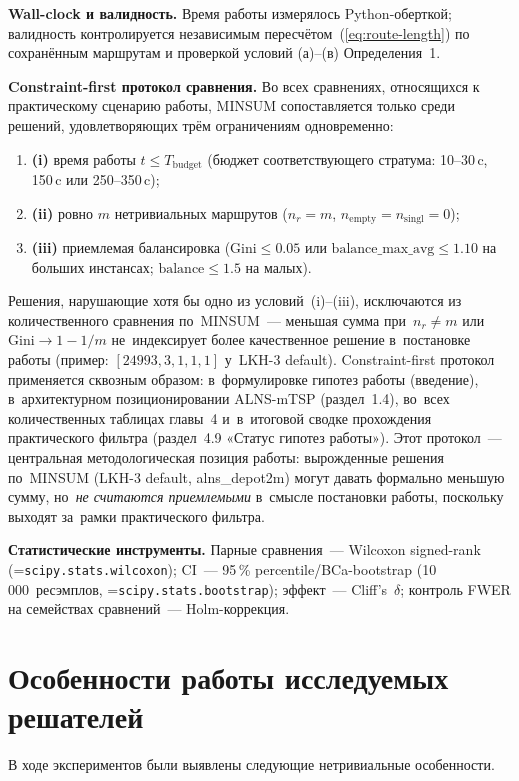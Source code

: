 \documentclass[a4paper,14pt]{extreport}
\makeatletter
\let\old@texttt\texttt
\renewcommand{\texttt}[1]{{\sloppy\hyphenchar\font=\m@ne\old@texttt{#1}}}
\makeatother
\begin{document}
\textbf{Wall-clock и валидность.} Время работы измерялось Python-оберткой; валидность контролируется независимым пересчётом~(\ref{eq:route-length}) по сохранённым маршрутам и проверкой условий (а)--(в) Определения~1.

\medskip
\textbf{Constraint-first протокол сравнения.} Во всех сравнениях, относящихся к практическому сценарию работы, MINSUM сопоставляется только среди решений, удовлетворяющих трём ограничениям одновременно:
\begin{enumerate}\itemsep1pt
\item \textbf{(i)} время работы $t\leq T_\mathrm{budget}$ (бюджет соответствующего стратума: 10--30\,c, 150\,c или 250--350\,c);
\item \textbf{(ii)} ровно $m$ нетривиальных маршрутов ($n_r=m$, $n_\mathrm{empty}=n_\mathrm{singl}=0$);
\item \textbf{(iii)} приемлемая балансировка ($\mathrm{Gini}\leq 0.05$ или $\mathrm{balance\_max\_avg}\leq 1.10$ на больших инстансах; $\mathrm{balance}\leq 1.5$ на малых).
\end{enumerate}
Решения, нарушающие хотя бы одно из условий~(i)--(iii), исключаются из количественного сравнения по~MINSUM~--- меньшая сумма при~$n_r\neq m$ или~$\mathrm{Gini}\to 1{-}1/m$ не~индексирует более качественное решение в~постановке работы (пример: $[24993,3,1,1,1]$ у~LKH-3 default). Constraint-first протокол применяется сквозным образом: в~формулировке гипотез работы (введение), в~архитектурном позиционировании ALNS-mTSP (раздел~1.4), во~всех количественных таблицах главы~4 и~в~итоговой сводке прохождения практического фильтра (раздел~4.9 «Статус гипотез работы»). Этот протокол~--- центральная методологическая позиция работы: вырожденные решения по~MINSUM (LKH-3 default, alns\_depot2m) могут давать формально меньшую сумму, но~\emph{не считаются приемлемыми} в~смысле постановки работы, поскольку выходят за~рамки практического фильтра.

\textbf{Статистические инструменты.} Парные сравнения~--- Wilcoxon signed-rank (\texttt{scipy.stats.wilcoxon}); CI~--- 95\,\% percentile/BCa-bootstrap (10\,000~ресэмплов, \texttt{scipy.stats.bootstrap}); эффект~--- Cliff's~$\delta$; контроль FWER на семействах сравнений~--- Holm-коррекция.

\section{Особенности работы исследуемых решателей}

В ходе экспериментов были выявлены следующие нетривиальные особенности.
\end{document}
